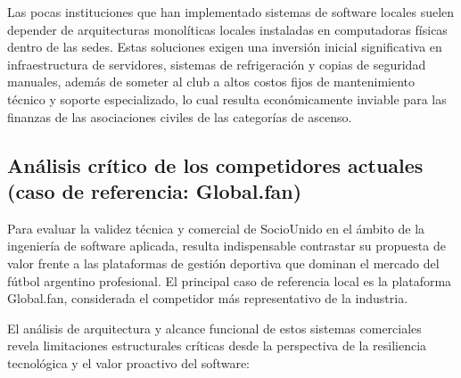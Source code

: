 Las pocas instituciones que han implementado sistemas de software locales suelen depender de arquitecturas monolíticas locales instaladas en computadoras físicas dentro de las sedes. Estas soluciones exigen una inversión inicial significativa en infraestructura de servidores, sistemas de refrigeración y copias de seguridad manuales, además de someter al club a altos costos fijos de mantenimiento técnico y soporte especializado, lo cual resulta económicamente inviable para las finanzas de las asociaciones civiles de las categorías de ascenso.

\newpage

\subsection{Análisis crítico de los competidores actuales (caso de referencia: Global.fan)}

Para evaluar la validez técnica y comercial de SocioUnido en el ámbito de la ingeniería de software aplicada, resulta indispensable contrastar su propuesta de valor frente a las plataformas de gestión deportiva que dominan el mercado del fútbol argentino profesional. El principal caso de referencia local es la plataforma Global.fan, considerada el competidor más representativo de la industria.

El análisis de arquitectura y alcance funcional de estos sistemas comerciales revela limitaciones estructurales críticas desde la perspectiva de la resiliencia tecnológica y el valor proactivo del software:

